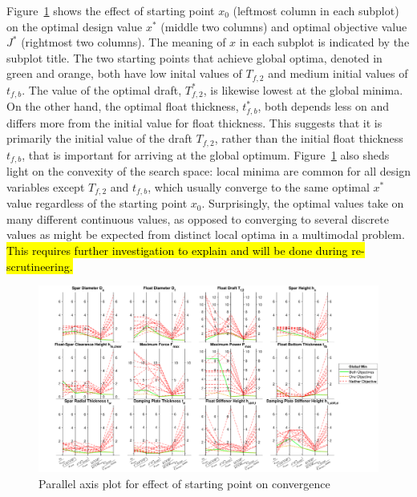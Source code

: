 \begin{appendices}
Figure~\ref{fig:multistart-parallel-axis} shows the effect of starting point $x_0$ (leftmost column in each subplot) on the optimal design value $x^*$ (middle two columns) and optimal objective value $J^*$ (rightmost two columns).
The meaning of $x$ in each subplot is indicated by the subplot title.
The two starting points that achieve global optima, denoted in green and orange, both have low inital values of $T_{f,2}$ and medium initial values of $t_{f,b}$.
The value of the optimal draft, $T_{f,2}^*$, is likewise lowest at the global minima. 
On the other hand, the optimal float thickness, $t_{f,b}^*$, both depends less on and differs more from the initial value for float thickness.
This suggests that it is primarily the initial value of the draft $T_{f,2}$, rather than the initial float thickness $t_{f,b}$, that is important for arriving at the global optimum.
Figure~\ref{fig:multistart-parallel-axis} also sheds light on the convexity of the search space: local minima are common for all design variables except $T_{f,2}$ and $t_{f,b}$, which usually converge to the same optimal $x^*$ value regardless of the starting point $x_0$.
Surprisingly, the optimal values take on many different continuous values, as opposed to converging to several discrete values as might be expected from distinct local optima in a multimodal problem.
\hl{This requires further investigation to explain and will be done during re-scrutineering.}

\begin{landscape}
\begingroup
\centering

\begin{figure}
\centering
\includegraphics[width=1.2\linewidth]{figs/multistart_parallel_axis.pdf}
\caption{Parallel axis plot for effect of starting point on convergence}\label{fig:multistart-parallel-axis}
\fillandplacepagenumber
\end{figure}

\endgroup
\end{landscape}

\end{appendices}